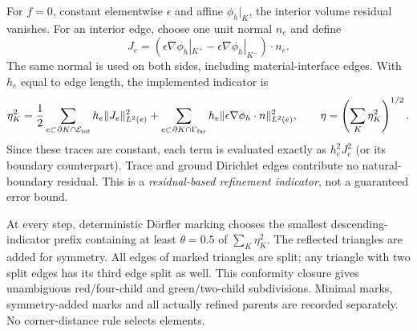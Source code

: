 For $f=0$, constant elementwise $\epsilon$ and affine $\phi_h|_K$, the interior volume residual vanishes. For an interior edge, choose one unit normal $n_e$ and define
\[
J_e=(\epsilon\nabla\phi_h|_{K^+}-\epsilon\nabla\phi_h|_{K^-})\cdot n_e.
\]
The same normal is used on both sides, including material-interface edges. With $h_e$ equal to edge length, the implemented indicator is
\begin{equation}
\eta_K^2=\frac12\sum_{e\subset\partial K\cap\mathcal E_{\rm int}}
h_e\|J_e\|_{L^2(e)}^2+
\sum_{e\subset\partial K\cap\Gamma_{\rm far}}
h_e\|\epsilon\nabla\phi_h\cdot n\|_{L^2(e)}^2,
\qquad \eta=\left(\sum_K\eta_K^2\right)^{1/2}.
\end{equation}
Since these traces are constant, each term is evaluated exactly as $h_e^2J_e^2$ (or its boundary counterpart). Trace and ground Dirichlet edges contribute no natural-boundary residual. This is a \emph{residual-based refinement indicator}, not a guaranteed error bound.

At every step, deterministic D\"orfler marking chooses the smallest descending-indicator prefix containing at least $\theta=0.5$ of $\sum_K\eta_K^2$. The reflected triangles are added for symmetry. All edges of marked triangles are split; any triangle with two split edges has its third edge split as well. This conformity closure gives unambiguous red/four-child and green/two-child subdivisions. Minimal marks, symmetry-added marks and all actually refined parents are recorded separately. No corner-distance rule selects elements.

